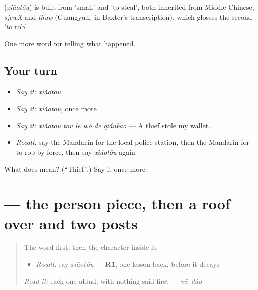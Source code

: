 \begin{cousinweb}
\textbf{} (\emph{xiǎotōu}) is built from  'small' and  'to steal', both inherited from Middle Chinese, \emph{sjewX} and \emph{thuw} (Guangyun, in Baxter's transcription), which glosses the second 'to rob'.
\end{cousinweb}

\begin{grammarlens}[title={What you've built}]
One more word for telling what happened.
\end{grammarlens}

\subsection*{Your turn}
\begin{itemize}
\raggedright
  \item \emph{Say it:} \emph{xiǎotōu}
  \item \emph{Say it:} \emph{xiǎotōu}, once more
  \item \emph{Say it:} \emph{xiǎotōu tōu le wǒ de qiánbāo} — A thief stole my wallet.
  \item \emph{Recall:} say the Mandarin for the local police station, then the Mandarin for to rob by force, then say \emph{xiǎotōu} again
\end{itemize}

\begin{tcolorbox}[breakable,colback=teal!4,colframe=teal!35!black,title={Before you move on}]
What does  mean? (\textquotedblleft{}Thief\textquotedblright{}.) Say it once more.
\end{tcolorbox}
\section[\texorpdfstring{\zh{偷} (tōu)}{偷 (tōu)}]{ — the person piece, then a roof over  and two posts}

\label{lesson:ZH-W309-tou-steal}



\begin{quote}
The word first, then the character inside it.

\begin{itemize}
\raggedright
  \item \emph{Recall:} say \emph{xiǎotōu} — \textbf{R1}, one lesson back, before it decays
\end{itemize}

\begin{quote}
 
\end{quote}

\emph{Read it:} each one aloud, with nothing said first — \emph{nǐ}, \emph{dào}
\end{quote}

